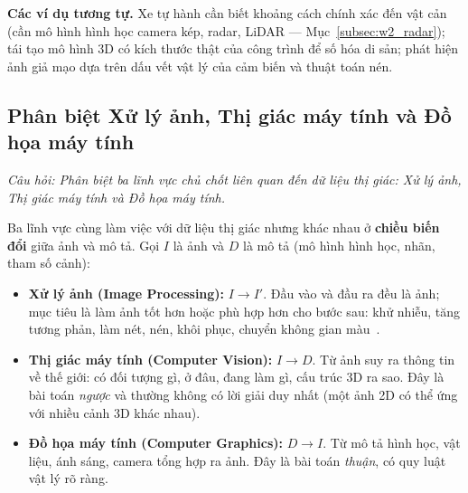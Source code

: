 \textbf{Các ví dụ tương tự.} Xe tự hành cần biết khoảng cách chính xác đến vật cản (cần mô hình hình học camera kép, radar, LiDAR — Mục~\ref{subsec:w2_radar}); tái tạo mô hình 3D có kích thước thật của công trình để số hóa di sản; phát hiện ảnh giả mạo dựa trên dấu vết vật lý của cảm biến và thuật toán nén.

\subsection{Phân biệt Xử lý ảnh, Thị giác máy tính và Đồ họa máy tính}
\label{subsec:w1_three_fields}

\textit{Câu hỏi: Phân biệt ba lĩnh vực chủ chốt liên quan đến dữ liệu thị giác: Xử lý ảnh, Thị giác máy tính và Đồ họa máy tính.}

Ba lĩnh vực cùng làm việc với dữ liệu thị giác nhưng khác nhau ở \textbf{chiều biến đổi} giữa ảnh và mô tả. Gọi $I$ là ảnh và $D$ là mô tả (mô hình hình học, nhãn, tham số cảnh):
\begin{itemize}
    \item \textbf{Xử lý ảnh (Image Processing):} $I \rightarrow I'$. Đầu vào và đầu ra đều là ảnh; mục tiêu là làm ảnh tốt hơn hoặc phù hợp hơn cho bước sau: khử nhiễu, tăng tương phản, làm nét, nén, khôi phục, chuyển không gian màu~\citep{gonzalez2018digital}.
    \item \textbf{Thị giác máy tính (Computer Vision):} $I \rightarrow D$. Từ ảnh suy ra thông tin về thế giới: có đối tượng gì, ở đâu, đang làm gì, cấu trúc 3D ra sao. Đây là bài toán \emph{ngược} và thường không có lời giải duy nhất (một ảnh 2D có thể ứng với nhiều cảnh 3D khác nhau).
    \item \textbf{Đồ họa máy tính (Computer Graphics):} $D \rightarrow I$. Từ mô tả hình học, vật liệu, ánh sáng, camera tổng hợp ra ảnh. Đây là bài toán \emph{thuận}, có quy luật vật lý rõ ràng.
\end{itemize}

